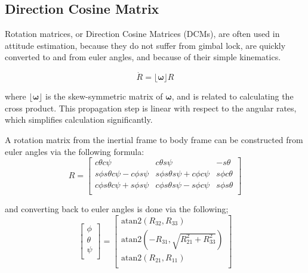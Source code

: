 \documentclass[paper=a4, fontsize=11pt]{scrartcl} %
\numberwithin{equation}{section} %
\numberwithin{figure}{section} %
\numberwithin{table}{section} %
\begin{document}
\subsection{Direction Cosine Matrix}

Rotation matrices, or Direction Cosine Matrices (DCMs), are often used in attitude estimation, because they do not suffer from gimbal lock, are quickly converted to and from euler angles, and because of their simple kinematics.

\begin{equation}
	\dot{R} = \lfloor\bm{\omega}\rfloor R
\end{equation}

where $\lfloor \bm{\omega} \rfloor$ is the skew-symmetric matrix of $\bm{\omega}$, and is related to calculating the cross product.  This propagation step is linear with respect to the angular rates, which simplifies calculation significantly.

A rotation matrix from the inertial frame to body frame can be constructed from euler angles via the following formula:
\newcommand{\ct}{c\theta}
\newcommand{\cp}{c\phi}
\newcommand{\cs}{c\psi}
\newcommand{\st}{s\theta}
\newcommand{\sphi}{s\phi}
\newcommand{\spsi}{s\psi}
\begin{equation}
	    R = \begin{bmatrix}
	    	\ct\cs & \ct\spsi & -\st \\
        \sphi\st\cs-\cp\spsi & \sphi\st\spsi+\cp\cs & \sphi\ct \\
        \cp\st\cs+\sphi\spsi & \cp\st\spsi-\sphi\cs & \sphi\st \\
        \end{bmatrix}
\end{equation}

and converting back to euler angles is done via the following;
\begin{equation}
  \begin{bmatrix}
    \phi \\
    \theta \\
    \psi \\
  \end{bmatrix} =
	\begin{bmatrix}
	 \textrm{atan2}\left(R_{32}, R_{33}\right) \\
   \textrm{atan2}\left(-R_{31}, \sqrt{R_{21}^2 + R_{33}^2}\right) \\
   \textrm{atan2}\left(R_{21}, R_{11}\right) \\
  \end{bmatrix}
\end{equation}
\end{document}
